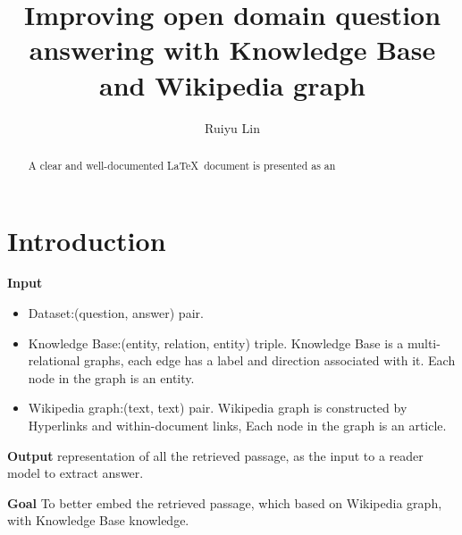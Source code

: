 \documentclass[sigconf]{acmart}
\begin{document}
	
	\title{Improving open domain question answering with Knowledge Base and Wikipedia graph}
	
	\author{Ruiyu Lin}
	
	
	\begin{abstract}
		A clear and well-documented \LaTeX\ document is presented as an
		
	\end{abstract}


	\maketitle
	
	\section{Introduction}
	
	\textbf{Input}
		\begin{itemize}
			\item {Dataset}:(question, answer) pair.
			
			\item{ Knowledge Base}:(entity, relation, entity) triple.
			 Knowledge Base is a multi-relational graphs, each edge has a label and direction associated with it. Each node in the graph is an entity.
			 
			 \item{ Wikipedia graph\cite{asai2019learning}}:(text, text) pair.
			 Wikipedia graph is constructed by Hyperlinks and within-document links, Each node in the graph is an article.
				
		\end{itemize}
		

	\textbf{Output}
	representation of all the retrieved passage, as the input to a reader model to extract answer.
	
	\textbf{Goal} 
	To better embed the retrieved passage, which based on Wikipedia graph, with  Knowledge Base knowledge.
	
\end{document}
